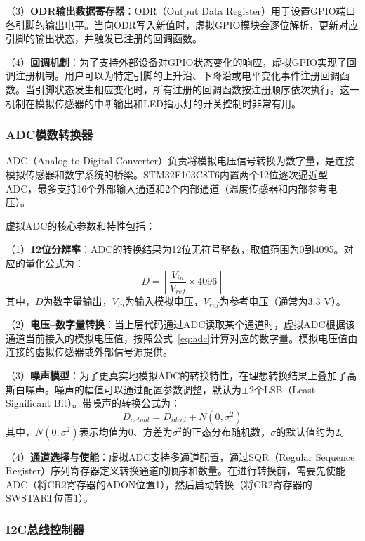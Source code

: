 \documentclass[12pt,a4paper]{ctexart}
\begin{document}
（3）\textbf{ODR输出数据寄存器}：ODR（Output Data Register）用于设置GPIO端口各引脚的输出电平。当向ODR写入新值时，虚拟GPIO模块会逐位解析，更新对应引脚的输出状态，并触发已注册的回调函数。

（4）\textbf{回调机制}：为了支持外部设备对GPIO状态变化的响应，虚拟GPIO实现了回调注册机制。用户可以为特定引脚的上升沿、下降沿或电平变化事件注册回调函数。当引脚状态发生相应变化时，所有注册的回调函数按注册顺序依次执行。这一机制在模拟传感器的中断输出和LED指示灯的开关控制时非常有用。

\subsubsection{ADC模数转换器}

ADC（Analog-to-Digital Converter）负责将模拟电压信号转换为数字量，是连接模拟传感器和数字系统的桥梁。STM32F103C8T6内置两个12位逐次逼近型ADC，最多支持16个外部输入通道和2个内部通道（温度传感器和内部参考电压）。

虚拟ADC的核心参数和特性包括：

（1）\textbf{12位分辨率}：ADC的转换结果为12位无符号整数，取值范围为0到4095。对应的量化公式为：
\begin{equation}
    D = \left\lfloor \frac{V_{in}}{V_{ref}} \times 4096 \right\rfloor
    \label{eq:adc}
\end{equation}
其中，$D$为数字量输出，$V_{in}$为输入模拟电压，$V_{ref}$为参考电压（通常为3.3 V）。

（2）\textbf{电压--数字量转换}：当上层代码通过ADC读取某个通道时，虚拟ADC根据该通道当前接入的模拟电压值，按照公式~\ref{eq:adc}计算对应的数字量。模拟电压值由连接的虚拟传感器或外部信号源提供。

（3）\textbf{噪声模型}：为了更真实地模拟ADC的转换特性，在理想转换结果上叠加了高斯白噪声。噪声的幅值可以通过配置参数调整，默认为$\pm 2$个LSB（Least Significant Bit）。带噪声的转换公式为：
\begin{equation}
    D_{actual} = D_{ideal} + N(0, \sigma^2)
\end{equation}
其中，$N(0, \sigma^2)$表示均值为0、方差为$\sigma^2$的正态分布随机数，$\sigma$的默认值约为2。

（4）\textbf{通道选择与使能}：虚拟ADC支持多通道配置，通过SQR（Regular Sequence Register）序列寄存器定义转换通道的顺序和数量。在进行转换前，需要先使能ADC（将CR2寄存器的ADON位置1），然后启动转换（将CR2寄存器的SWSTART位置1）。

\subsubsection{I2C总线控制器}
\end{document}
